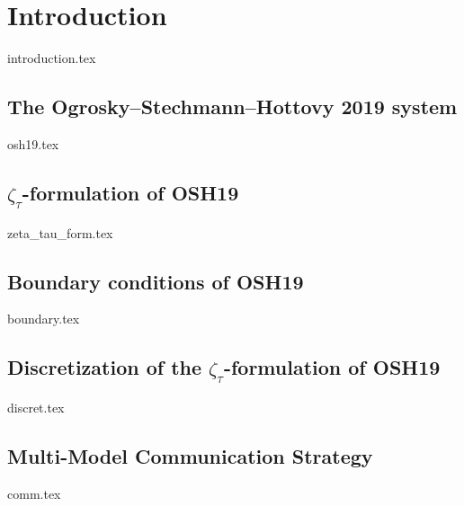 \documentclass[letterpaper, 12pt]{article}
\begin{document}
\heading

\newpage

\tableofcontents

\newpage

\section{Introduction}
    {introduction.tex}
    
    \subsection{The Ogrosky--Stechmann--Hottovy 2019 system} \label{subsection:osh19}
    	{osh19.tex}
    	
    \subsection{$\zeta_{\tau}$-formulation of OSH19} \label{subsubsection:zeta_tau_form}
    		{zeta_tau_form.tex}

	\subsection{Boundary conditions of OSH19}
		{boundary.tex}

	\subsection{Discretization of the $\zeta_{\tau}$-formulation of OSH19} \label{subsection:discret}
    	{discret.tex}

  	\subsection{Multi-Model Communication Strategy} \label{subsection:comm}
  		{comm.tex}
   

	
\end{document}
